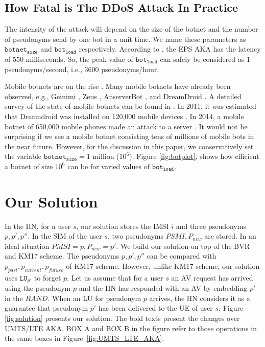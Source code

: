 \documentclass{llncs} %
\begin{document}
\subsection{How Fatal is The DDoS Attack In Practice} \label{sec:how_fatal_ddos}
The intensity of the attack will depend on the size of the botnet and the number of pseudonyms send by one bot in a unit time. We name these parameters as $\texttt{botnet}_{\texttt{size}}$ and $\texttt{bot}_{\texttt{load}}$ respectively. According to \cite{thesislund}, the EPS AKA has the latency of $550$ milliseconds. So, the peak value of $\texttt{bot}_{\texttt{load}}$ can safely be considered as $1$ pseudonyms/second, i.e., 3600 pseudonyms/hour.

Mobile botnets are on the rise \cite{botnet_ccs09_symbian,botnet_usenix11,botnet_australia_2016}. Many mobile botnets have already been observed, e.g., Geinimi \cite{botnet_geinimi10}, Zeus \cite{botnet_zeus11}, AnserverBot \cite{botnet_anserverbot}, and DreamDroid \cite{botnet_dreamdroid11}. A detailed survey of the state of mobile botnets can be found in \cite{botnet_threat15}. In 2011, it was estimated that Dreamdroid was installed on 120,000 mobile devices \cite{botnet_dreamdroid11}. In 2014, a mobile botnet of 650,000 mobile phones made an attack to a server \cite{chinese_spam}. It would not be surprising if we see a mobile botnet consisting tens of millions of mobile bots in the near future. However, for the discussion in this paper, we conservatively set the variable $\texttt{botnet}_{\texttt{size}} = 1$ million ($10^6$). Figure \ref{fig:botplot}, shows how efficient a botnet of size $10^6$ can be for varied values of $\texttt{bot}_{\texttt{load}}$. 



\section{Our Solution}
In the HN, for a user $s$, our solution stores the IMSI $i$ and three pseudonyms $p,p',p''$. In the SIM of the user $s$, two pseudonyms $PSMI,P_{new}$ are stored. In an ideal situation $PMSI = p, P_{new} = p'$. We build our solution on top of the BVR and KM17 scheme. The pseudonyms $p,p',p''$ can be compared with $p_{past},p_{current},p_{future}$ of KM17 scheme. However, unlike KM17 scheme, our solution uses $\texttt{LU}_{p'}$ to forget $p$. Let us assume that for a user $s$ an AV request has arrived using the pseudonym $p$ and the HN has responded with an AV by embedding $p'$ in the $RAND$. When an LU for pseudonym $p$ arrives, the HN considers it as a guarantee that pseudonym $p'$ has been delivered to the UE of user $s$.  Figure \ref{fig:solution} presents our solution. The bold texts present the changes over UMTS/LTE AKA. BOX A and BOX B in the figure refer to those operations in the same boxes in Figure~\ref{fig:UMTS_LTE_AKA}.
\end{document}
